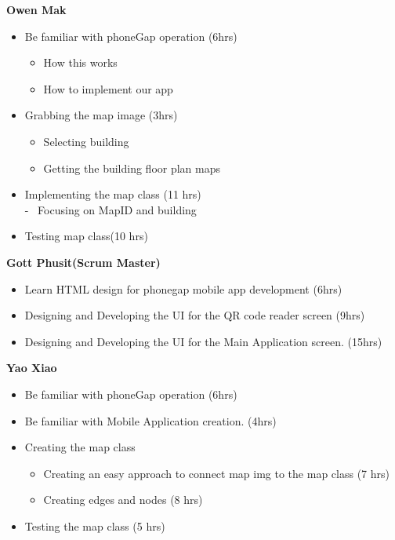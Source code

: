 \documentclass[12pt]{article}
\begin{document}
\textbf{Owen Mak}
\begin{itemize}
\item Be familiar with phoneGap operation (6hrs)
\begin{itemize} \renewcommand{\labelitemii}{-}
	\item How this works
	\item How to implement our app
\end{itemize}

\item Grabbing the map image   (3hrs)
\begin{itemize} \renewcommand{\labelitemii}{-}
	\item Selecting building
	\item Getting the building floor plan maps
\end{itemize}

\item Implementing the map class (11 hrs) \\ - \ Focusing on MapID and building 
\item Testing map class(10 hrs)
\end{itemize}



\textbf{Gott Phusit(Scrum Master)}
\begin{itemize}
\item Learn HTML design for phonegap mobile app development (6hrs)
\item Designing and Developing the UI for the QR code reader screen (9hrs)
\item Designing and Developing the UI for the Main Application screen. (15hrs)

\end{itemize}

\textbf{Yao Xiao}
\begin{itemize}
\item Be familiar with phoneGap operation (6hrs)
\item Be familiar with Mobile Application creation. (4hrs)
\item Creating the map class  
	\begin{itemize}
		\item Creating an easy approach to connect map img to the map class (7 hrs)
		\item Creating edges and nodes (8 hrs)		
	\end{itemize}
\item Testing the map class (5 hrs)

\end{itemize}
\end{document}
